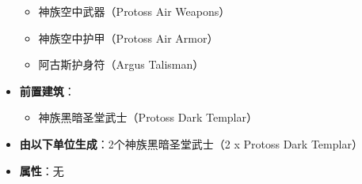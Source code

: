 \begin{tcolorbox}[colback=white, colframe=black!60!white, title=Protoss\_Dark\_Archon(), arc=0mm]
\begin{itemize}
\begin{itemize}
                \item 神族空中武器（Protoss Air Weapons）
                \item 神族空中护甲（Protoss Air Armor）
                \item 阿古斯护身符（Argus Talisman）
            \end{itemize}
        \item \textbf{前置建筑}：
            \begin{itemize}
                \item 神族黑暗圣堂武士（Protoss Dark Templar）
            \end{itemize}
        \item \textbf{由以下单位生成}：2个神族黑暗圣堂武士（2 x Protoss Dark Templar）
        \item \textbf{属性}：无
    \end{itemize} 
\end{tcolorbox}

